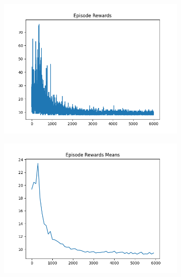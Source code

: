 \begin{figure}[H]
\begin{subfigure}{.47\linewidth}
        \includegraphics[width=\textwidth]{pole/2024-06-14_18-54-27_dqn_cartpole_episode_rewards.png}
    \end{subfigure}
    \begin{subfigure}{.47\linewidth}
        \centering
        \includegraphics[width=\textwidth]{pole/2024-06-14_18-54-27_dqn_cartpole_episode_rewards_means.png}
    \end{subfigure}
\end{figure}
